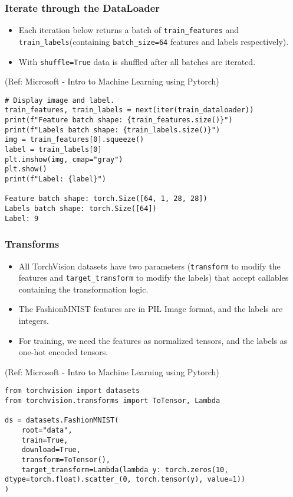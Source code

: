 \begin{frame}[fragile] \frametitle{Iterate through the DataLoader}

\begin{itemize}
\item Each iteration below returns a batch of \lstinline|train_features| and \lstinline|train_labels|(containing \lstinline|batch_size=64| features and labels respectively).
\item With \lstinline|shuffle=True| data is shuffled after all batches are iterated.
\end{itemize}

\tiny{(Ref: Microsoft - Intro to Machine Learning using Pytorch)}


\begin{lstlisting}
# Display image and label.
train_features, train_labels = next(iter(train_dataloader))
print(f"Feature batch shape: {train_features.size()}")
print(f"Labels batch shape: {train_labels.size()}")
img = train_features[0].squeeze()
label = train_labels[0]
plt.imshow(img, cmap="gray")
plt.show()
print(f"Label: {label}")

Feature batch shape: torch.Size([64, 1, 28, 28])
Labels batch shape: torch.Size([64])
Label: 9
\end{lstlisting}

\end{frame}


\begin{frame}[fragile] \frametitle{Transforms}

\begin{itemize}
\item All TorchVision datasets have two parameters (\lstinline|transform| to modify the features and \lstinline|target_transform| to modify the labels) that accept callables containing the transformation logic. 
\item The FashionMNIST features are in PIL Image format, and the labels are integers. 
\item For training, we need the features as normalized tensors, and the labels as one-hot encoded tensors.
\end{itemize}

\tiny{(Ref: Microsoft - Intro to Machine Learning using Pytorch)}

\begin{lstlisting}
from torchvision import datasets
from torchvision.transforms import ToTensor, Lambda

ds = datasets.FashionMNIST(
    root="data",
    train=True,
    download=True,
    transform=ToTensor(),
    target_transform=Lambda(lambda y: torch.zeros(10, dtype=torch.float).scatter_(0, torch.tensor(y), value=1))
)
\end{lstlisting}

\end{frame}


